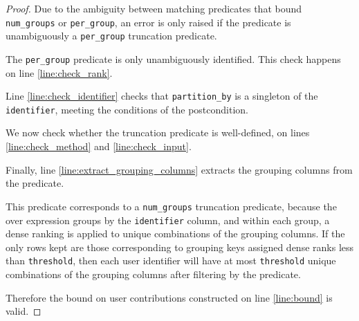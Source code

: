\documentclass{article}
\begin{document}
\begin{proof}
    Due to the ambiguity between matching predicates that bound \texttt{num\_groups} or \texttt{per\_group},
    an error is only raised if the predicate is unambiguously a \texttt{per\_group} truncation predicate.
    
    The \texttt{per\_group} predicate is only unambiguously identified.
    This check happens on line \ref{line:check_rank}.

    Line \ref{line:check_identifier} checks that \texttt{partition\_by} is a singleton of the \texttt{identifier}, meeting the conditions of the postcondition.

    We now check whether the truncation predicate is well-defined, on lines \ref{line:check_method} and \ref{line:check_input}.

    Finally, line \ref{line:extract_grouping_columns} extracts the grouping columns from the predicate.

    This predicate corresponds to a \texttt{num\_groups} truncation predicate,
    because the over expression groups by the \texttt{identifier} column,
    and within each group, a dense ranking is applied to unique combinations of the grouping columns.
    If the only rows kept are those corresponding to grouping keys assigned dense ranks less than \texttt{threshold},
    then each user identifier will have at most \texttt{threshold} unique combinations of the grouping columns
    after filtering by the predicate.

    Therefore the bound on user contributions constructed on line \ref{line:bound} is valid.
\end{proof}
\end{document}
